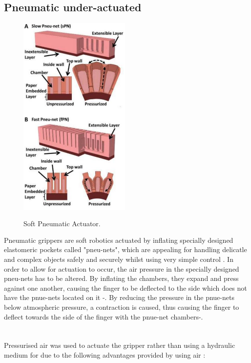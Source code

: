 \documentclass[11pt]{article}
\begin{document}
\subsection{Pneumatic under-actuated}
\begin{figure}
\begin{center}
\caption{Soft Pneumatic Actuator.}
\includegraphics[width=5.5cm]{Pneumatic1}
\label{pneumatic1}
\end{center}
\end{figure} 
Pneumatic grippers are soft robotics actuated by inflating specially designed elastomeric pockets called "pneu-nets", which are appealing for handling delicatle and complex objects safely and securely whilst using very simple control \cite{mosadegh2014pneumatic}. In order to allow for actuation to occur, the air pressure in the specially designed pneu-nets has to be altered. By inflating the chambers, they expand and press against one another, causing the finger to be deflected to the side which does not have the pnue-nets located on it \cite{ilievski2011soft}-\cite{marchese2015recipe}. By reducing the pressure in the pnue-nets below atmospheric pressure, a contraction is caused, thus causing the finger to deflect towards the side of the finger with the pnue-net chambers\cite{ilievski2011soft}-\cite{marchese2015recipe}. 
\\
\\
\\
\newline
Pressurised air was used to actuate the gripper rather than using a hydraulic medium for due to the following advantages provided by using air \cite{mosadegh2014pneumatic}:
\end{document}
